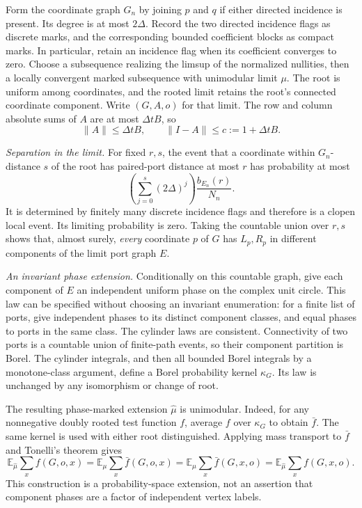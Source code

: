 \begin{informalproof}
Form the coordinate graph $G_n$ by joining $p$ and $q$ if either directed
incidence is present.  Its degree is at most $2\Delta$.
Record the two directed incidence flags as discrete marks, and the
corresponding bounded coefficient blocks as compact marks.  In particular,
retain an incidence flag when its coefficient converges to zero.
Choose a subsequence realizing the limsup of the normalized nullities,
then a locally convergent marked subsequence with unimodular limit $\mu$.
The root is uniform among coordinates, and the rooted limit retains the
root's connected coordinate component.  Write $(G,A,o)$ for that limit.
The row and column absolute sums of $A$ are at most $\Delta tB$, so
\[
 \|A\|\le\Delta tB,\qquad \|I-A\|\le c:=1+\Delta tB.
\]

\emph{Separation in the limit.}
For fixed $r,s$, the event that a coordinate within $G_n$-distance $s$
of the root has paired-port distance at most $r$ has probability at most
\[
 \left(\sum_{j=0}^s(2\Delta)^j\right)\frac{b_{E_n}(r)}{N_n}.
\]
It is determined by finitely many discrete incidence flags and therefore
is a clopen local event.  Its limiting probability is zero.  Taking the
countable union over $r,s$ shows that, almost surely, \emph{every}
coordinate $p$ of $G$ has $L_p,R_p$ in different components of the limit
port graph $E$.

\emph{An invariant phase extension.}
Conditionally on this countable graph, give each component of $E$ an
independent uniform phase on the complex unit circle.  This law can be
specified without choosing an invariant enumeration: for a finite list
of ports, give independent phases to its distinct component classes,
and equal phases to ports in the same class.  The cylinder laws are
consistent.  Connectivity of two ports is a countable union of finite-path
events, so their component partition is Borel.  The cylinder integrals,
and then all bounded Borel integrals by a monotone-class argument, define
a Borel probability kernel $\kappa_G$.  Its law is unchanged by any
isomorphism or change of root.

The resulting phase-marked extension $\widehat\mu$ is unimodular.
Indeed, for any nonnegative doubly rooted test function $f$, average
$f$ over $\kappa_G$ to obtain $\bar f$.  The same kernel is used with
either root distinguished.  Applying mass transport to $\bar f$ and
Tonelli's theorem gives
\[
 \mathbb E_{\widehat\mu}\sum_x f(G,o,x)
 =\mathbb E_\mu\sum_x\bar f(G,o,x)
 =\mathbb E_\mu\sum_x\bar f(G,x,o)
 =\mathbb E_{\widehat\mu}\sum_x f(G,x,o).
\]
This construction is a probability-space extension, not an assertion
that component phases are a factor of independent vertex labels.


\end{informalproof}

